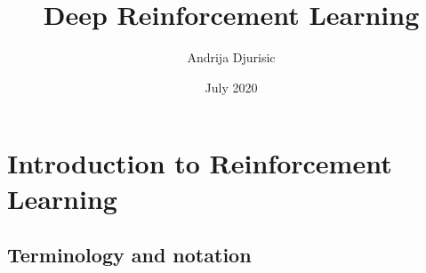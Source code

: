 \documentclass[a4paper]{article}
\title{Deep Reinforcement Learning}
\author{Andrija Djurisic}
\date{July 2020}
\begin{document}
	\maketitle

\section{Introduction to Reinforcement Learning}
\subsection{Terminology and notation}
\end{document}
